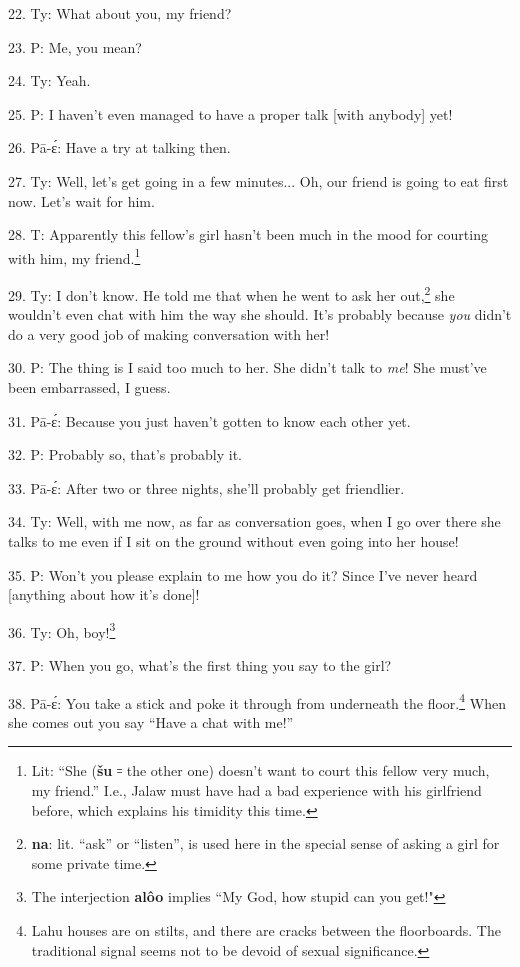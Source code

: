 22. Ty: What about you, my friend?

23. P: Me, you mean?

24. Ty: Yeah.

25. P: I haven't even managed to have a proper talk [with anybody] yet!

26. Pā-ɛ́: Have a try at talking then.

27. Ty: Well, let's get going in a few minutes... Oh, our friend is going
to eat first now. Let's wait for him.

28. T:  Apparently this fellow's girl hasn't
been much in the mood for courting with him, my friend.\footnote{Lit: ``She (\textbf{šu} ꞊ the other one) doesn't want to court this fellow very much, my friend.'' I.e., Jalaw must have had a bad experience with his girlfriend before, which explains his timidity this time.}

29. Ty: I don't know. He told me that when he went to ask her out,\footnote{\textbf{na}: lit. ``ask'' or ``listen'', is used here in the special sense of asking a girl for some private time.} she
wouldn't even chat with him the way she should. 
It's probably because \textit{you} didn't do a very good job of making conversation
with her!

30. P: The thing is I said too much to her. She didn't talk to\textit{ me}!
She must've been embarrassed, I guess.

31. Pā-ɛ́: Because you just haven't gotten to know each other yet.

32. P: Probably so, that's probably it.

33. Pā-ɛ́: After two or three nights, she'll probably get friendlier.

34. Ty: Well, with me now, as far as conversation goes, when I go over there
she talks to me even if I sit on the ground without even going into her house!

35. P: Won't you please explain to me how you do it? Since I've never heard
[anything about how it's done]!

36. Ty: Oh, boy!\footnote{The interjection \textbf{alôo} implies ``My God, how stupid can you get!"}

37. P: When you go, what's the first thing you say to the girl?

38. Pā-ɛ́: You take a stick and poke it through from underneath the floor.\footnote{Lahu houses are on stilts, and there are cracks between the floorboards. The traditional signal seems not to be devoid of sexual significance.}
When she comes out you say ``Have a chat with me!''


